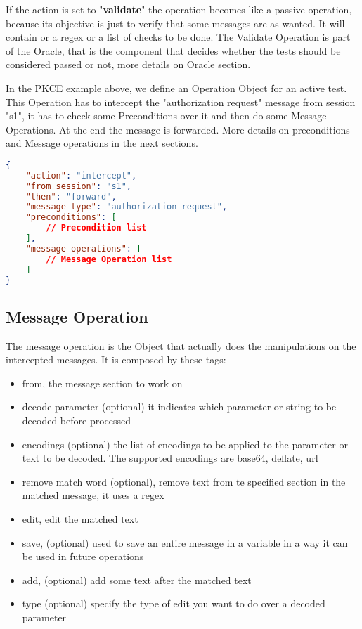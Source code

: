 If the action is set to "\textbf{validate}" the operation becomes like a passive operation, because its objective is just to verify that some messages are as wanted. It will contain or a regex or a list of checks to be done. The Validate Operation is part of the Oracle, that is the component that decides whether the tests should be considered passed or not, more details on Oracle section.

In the PKCE example above, we define an Operation Object for an active test. This Operation has to intercept the "authorization request" message from session "s1", it has to check some Preconditions over it and then do some Message Operations. At the end the message is forwarded. More details on preconditions and Message operations in the next sections.

\begin{lstlisting}[language=json]
{
    "action": "intercept",
    "from session": "s1",
    "then": "forward",
    "message type": "authorization request",
    "preconditions": [
        // Precondition list
    ],
    "message operations": [
        // Message Operation list
    ]
}
\end{lstlisting}

\subsection{Message Operation}
The message operation is the Object that actually does the manipulations on the intercepted messages. It is composed by these tags:
\begin{itemize}
    \item from, the message section to work on
    \item decode parameter (optional) it indicates which parameter or string to be decoded before processed
    \item encodings (optional) the list of encodings to be applied to the parameter or text to be decoded. The supported encodings are base64, deflate, url
    \item remove match word (optional), remove text from te specified section in the matched message, it uses a regex
    \item edit, edit the matched text
    \item save, (optional) used to save an entire message in a variable in a way it can be used in future operations
    \item add, (optional) add some text after the matched text
    \item type (optional) specify the type of edit you want to do over a decoded parameter
\end{itemize}

